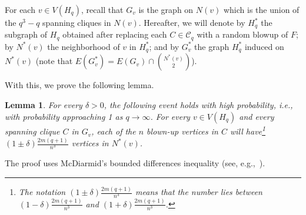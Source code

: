 \documentclass[A4paper,reqno,oneside,12pt]{amsart}
\theoremstyle{plain}
\newtheorem{theorem}{Theorem}[section]
\newtheorem{lemma}[theorem]{Lemma}
\theoremstyle{definition}
\newcommand{\scC}{\mathscr{C}}
\newcommand{\bbE}{\mathbb{E}}
\newcommand{\bbP}{\mathbb{P}}
\newcommand{\R}{\mathbb{R}}
\def\d{\delta}
\begin{document}
For each $v \in V(H_q)$, recall that $G_v$ is the graph on $N(v)$ which is the union of the $q^3-q$ spanning cliques in $N(v)$.
Hereafter, we will denote by $H_q^*$ the subgraph of $H_q$ obtained after replacing each $C \in \scC_q$ with a random blowup of $F$; by $N^*(v)$ the neighborhood of $v$ in $H_q^*$; and by $G_v^*$ the graph $H_q^*$ induced on $N^*(v)$ (note that $E(G_v^*) = E(G_v) \cap \binom{N^*(v)}{2}$).

With this, we prove the following lemma.

\begin{lemma}
\label{lem: blowup}
    For every $\d > 0$, the following event holds with high probability, i.e., with probability approaching 1 as $q \to \infty$.
    For every $v \in V(H_q)$ and every spanning clique $C$ in $G_v$,
    each of the $n$ blown-up vertices in $C$ will have\footnote{The notation $(1 \pm \d) \frac{2m(q+1)}{n^3}$ means that the number lies between $(1 - \d) \frac{2m(q+1)}{n^3}$ and $(1 + \d) \frac{2m(q+1)}{n^3}$.} $(1 \pm \d) \frac{2m(q+1)}{n^3}$ vertices in $N^*(v)$.
\end{lemma}

The proof uses McDiarmid's bounded differences inequality (see, e.g.,~\cite{M}).

\end{document}
